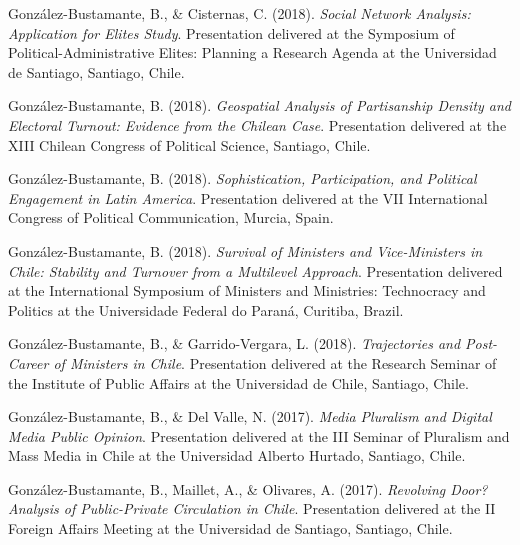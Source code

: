 \begin{publications}
\begin{benumerate}{77}
\item{\small González-Bustamante, B., \& Cisternas, C. (2018). {\itshape Social Network Analysis: Application for Elites Study}. Presentation delivered at the Symposium of Political-Administrative Elites: Planning a Research Agenda at the Universidad de Santiago, Santiago, Chile.}\vspace{1mm}

\item{\small González-Bustamante, B. (2018). {\itshape Geospatial Analysis of Partisanship Density and Electoral Turnout: Evidence from the Chilean Case}. Presentation delivered at the XIII Chilean Congress of Political Science, Santiago, Chile.}\vspace{1mm}

\item{\small González-Bustamante, B. (2018). {\itshape Sophistication, Participation, and Political Engagement in Latin America}. Presentation delivered at the VII International Congress of Political Communication, Murcia, Spain.}\vspace{1mm}

\item{\small González-Bustamante, B. (2018). {\itshape Survival of Ministers and Vice-Ministers in Chile: Stability and Turnover from a Multilevel Approach}. Presentation delivered at the International Symposium of Ministers and Ministries: Technocracy and Politics at the Universidade Federal do Paraná, Curitiba, Brazil.}\vspace{1mm}

\item{\small González-Bustamante, B., \& Garrido-Vergara, L. (2018). {\itshape Trajectories and Post-Career of Ministers in Chile}. Presentation delivered at the Research Seminar of the Institute of Public Affairs at the Universidad de Chile, Santiago, Chile.}\vspace{1mm}

\item{\small González-Bustamante, B., \& Del Valle, N. (2017). {\itshape Media Pluralism and Digital Media Public Opinion}. Presentation delivered at the III Seminar of Pluralism and Mass Media in Chile at the Universidad Alberto Hurtado, Santiago, Chile.}\vspace{1mm}

\item{\small González-Bustamante, B., Maillet, A., \& Olivares, A. (2017). {\itshape Revolving Door? Analysis of Public-Private Circulation in Chile}. Presentation delivered at the II Foreign Affairs Meeting at the Universidad de Santiago, Santiago, Chile.}\vspace{1mm}


\end{benumerate}
\end{publications}
